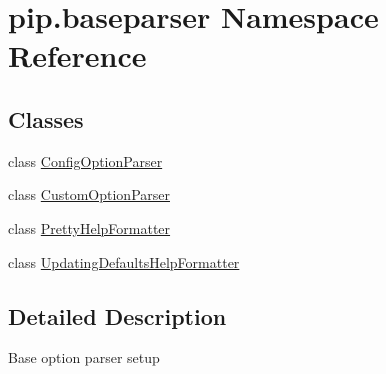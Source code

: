 \hypertarget{namespacepip_1_1baseparser}{}\section{pip.\+baseparser Namespace Reference}
\label{namespacepip_1_1baseparser}
\subsection*{Classes}
\begin{DoxyCompactItemize}
\item 
class \hyperlink{classpip_1_1baseparser_1_1_config_option_parser}{Config\+Option\+Parser}
\item 
class \hyperlink{classpip_1_1baseparser_1_1_custom_option_parser}{Custom\+Option\+Parser}
\item 
class \hyperlink{classpip_1_1baseparser_1_1_pretty_help_formatter}{Pretty\+Help\+Formatter}
\item 
class \hyperlink{classpip_1_1baseparser_1_1_updating_defaults_help_formatter}{Updating\+Defaults\+Help\+Formatter}
\end{DoxyCompactItemize}


\subsection{Detailed Description}
\begin{DoxyVerb}Base option parser setup\end{DoxyVerb}
 